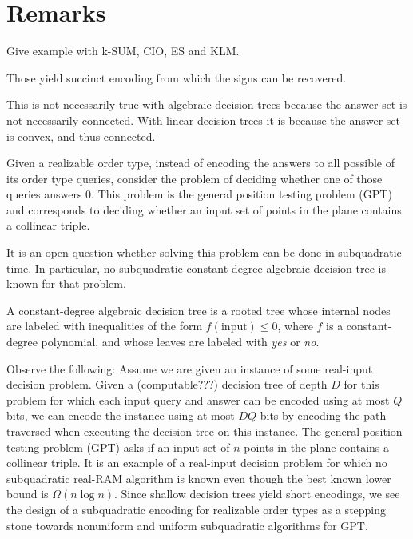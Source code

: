 \section{Remarks}\label{sec:remarks}


\ifjocg
Give example with k-SUM, CIO, ES and KLM.

Those yield succinct encoding from which the signs can be recovered.

This is not necessarily true with algebraic decision trees because the answer
set is not necessarily connected. With linear decision trees it is because the
answer set is convex, and thus connected.

Given a realizable order type, instead of encoding the answers to all possible
of its order type queries, consider the problem of deciding whether one of
those queries answers \(0\).
This problem is the general position testing problem (GPT) and corresponds to
deciding whether an input set of points in the plane contains a collinear
triple.

It is an open question whether solving this problem can be done in subquadratic
time. In particular, no subquadratic constant-degree algebraic decision tree is
known for that problem.

A constant-degree algebraic decision tree is a rooted tree whose internal nodes are
labeled with inequalities of the form \(f(\text{input}) \leq 0\), where
\(f\) is a constant-degree polynomial,
and whose leaves are labeled with \emph{yes} or \emph{no}.
\fi

Observe the following: Assume we are given an instance of some real-input
decision problem. Given a (computable???) decision tree of depth \(D\) for this problem for which
each input query and answer can be encoded using at most \(Q\) bits, we can
encode the instance using at most \(DQ\) bits by encoding the path traversed when
executing the decision tree on this instance. The general position testing
problem (GPT) asks if an input set of \(n\) points in the plane contains a
collinear triple. It is an example of a real-input decision problem for which
no subquadratic real-RAM algorithm is known even though the best known lower
bound is \(\Omega(n \log n)\). Since shallow decision trees yield short encodings,
we see the design of a subquadratic encoding for realizable order types as a
stepping stone towards nonuniform and uniform subquadratic algorithms for
GPT\@.

